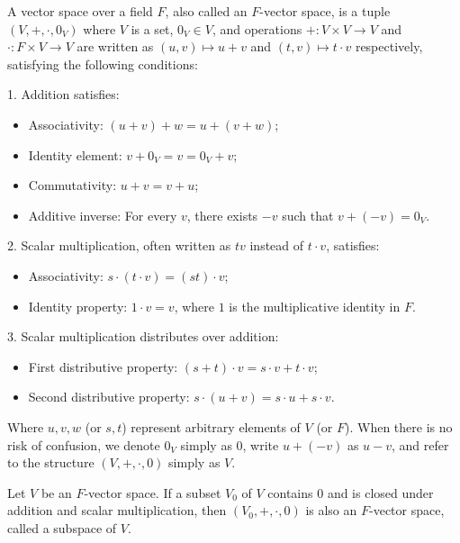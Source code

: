 \begin{definition}
  A vector space over a field $F$, also called an $F$-vector space, is a tuple $(V, +, \cdot, 0_V)$ where $V$ is a set, $0_V \in V$, and operations $+: V \times V \rightarrow V$ and $\cdot: F \times V \rightarrow V$ are written as $(u,v) \mapsto u + v$ and $(t,v) \mapsto t \cdot v$ respectively, satisfying the following conditions:

  1. Addition satisfies:
  \begin{itemize}
    \item Associativity: $(u + v) + w = u + (v + w)$;
    \item Identity element: $v + 0_V = v = 0_V + v$;
    \item Commutativity: $u + v = v + u$;
    \item Additive inverse: For every $v$, there exists $-v$ such that $v + (-v) = 0_V$.
  \end{itemize}

  2. Scalar multiplication, often written as $tv$ instead of $t \cdot v$, satisfies:
  \begin{itemize}
    \item Associativity: $s \cdot (t \cdot v) = (st) \cdot v$;
    \item Identity property: $1 \cdot v = v$, where $1$ is the multiplicative identity in $F$.
  \end{itemize}

  3. Scalar multiplication distributes over addition:
  \begin{itemize}
    \item First distributive property: $(s + t) \cdot v = s \cdot v + t \cdot v$;
    \item Second distributive property: $s \cdot (u + v) = s \cdot u + s \cdot v$.
  \end{itemize}

  Where $u, v, w$ (or $s, t$) represent arbitrary elements of $V$ (or $F$). When there is no risk of confusion, we denote $0_V$ simply as $0$, write $u + (-v)$ as $u - v$, and refer to the structure $(V, +, \cdot, 0)$ simply as $V$.
\end{definition}

\begin{definition}
  Let $V$ be an $F$-vector space. If a subset $V_0$ of $V$ contains $0$ and is closed under addition and scalar multiplication, then $(V_0, +, \cdot, 0)$ is also an $F$-vector space, called a subspace of $V$.
\end{definition}

